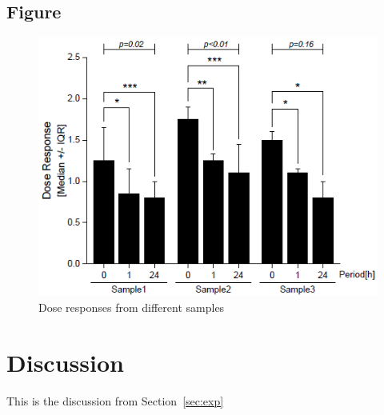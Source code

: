 \documentclass{article}
\begin{document}
\subsection{Figure}
\begin{figure}
  \centering
  \includegraphics[scale=0.4]{fig/fig1.png}
  \caption{Dose responses from different samples}
  \label{fig:dose_response}
\end{figure}

\section{Discussion}
\label{sec:result}
This is the discussion from Section~\ref{sec:exp}

% 


\end{document}
